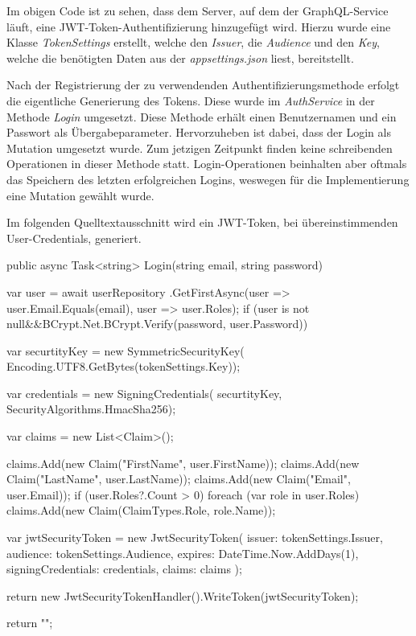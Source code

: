 Im obigen Code ist zu sehen, dass dem Server, auf dem der GraphQL-Service läuft, eine JWT-Token-Authentifizierung hinzugefügt wird.
Hierzu wurde eine Klasse \textit{TokenSettings} erstellt, welche den \textit{Issuer}, die \textit{Audience} und den \textit{Key}, welche die benötigten Daten aus der \textit{appsettings.json} liest, bereitstellt.
\newline

Nach der Registrierung der zu verwendenden Authentifizierungsmethode erfolgt die eigentliche Generierung des Tokens.
Diese wurde im \textit{AuthService} in der Methode \textit{Login} umgesetzt.
Diese Methode erhält einen Benutzernamen und ein Passwort als Übergabeparameter.
Hervorzuheben ist dabei, dass der Login als Mutation umgesetzt wurde.
Zum jetzigen Zeitpunkt finden keine schreibenden Operationen in dieser Methode statt.
Login-Operationen beinhalten aber oftmals das Speichern des letzten erfolgreichen Logins, weswegen für die Implementierung eine Mutation gewählt wurde.
\newline

Im folgenden Quelltextausschnitt wird ein JWT-Token, bei übereinstimmenden User-Credentials, generiert.

\begin{JsCode}
public async Task<string> Login(string email, string password) {
   var user = await userRepository
            .GetFirstAsync(user => user.Email.Equals(email), user => user.Roles);
   if (user is not null&&BCrypt.Net.BCrypt.Verify(password, user.Password)){
       var securtityKey = new SymmetricSecurityKey(
                                Encoding.UTF8.GetBytes(tokenSettings.Key));
   
       var credentials = new SigningCredentials(
                                securtityKey, SecurityAlgorithms.HmacSha256);
   
       var claims = new List<Claim>();
   
       claims.Add(new Claim("FirstName", user.FirstName));
       claims.Add(new Claim("LastName", user.LastName));
       claims.Add(new Claim("Email", user.Email));
       if (user.Roles?.Count > 0) {
           foreach (var role in user.Roles) {
               claims.Add(new Claim(ClaimTypes.Role, role.Name));
           }
       }
   
       var jwtSecurityToken = new JwtSecurityToken(
           issuer: tokenSettings.Issuer,
           audience: tokenSettings.Audience,
           expires: DateTime.Now.AddDays(1),
           signingCredentials: credentials,
           claims: claims
       );
   
       return new JwtSecurityTokenHandler().WriteToken(jwtSecurityToken);
   }

return "";
}
\end{JsCode}

